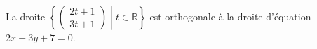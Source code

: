 La droite  $\left\{\begin{pmatrix}2t+1\\3t+1\end{pmatrix}\middle| t\in\mathbb{R}\right\}$ est orthogonale à la droite d'équation $2x+3y+7=0$.

\begin{reponses}
\end{reponses}

